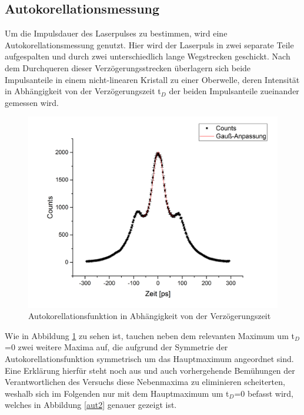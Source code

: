 \subsection{Autokorellationsmessung}
Um die Impulsdauer des Laserpulses zu bestimmen, wird eine Autokorellationsmessung genutzt. Hier wird der Laserpuls in zwei separate Teile aufgespalten und durch zwei unterschiedlich lange Wegstrecken geschickt. Nach dem Durchqueren dieser Verzögerungsstrecken überlagern sich beide Impulsanteile in einem nicht-linearen Kristall zu einer Oberwelle, deren Intensität in Abhängigkeit von der Verzögerungszeit t$_D$ der beiden Impulsanteile zueinander gemessen wird. 
\begin{figure}[H]
	\begin{center}
		\includegraphics[scale=.5]{Bilder/Autokorr1.png}
		\caption{Autokorellationsfunktion in Abhängigkeit von der Verzögerungszeit}
		\label{aut1}
	\end{center}
\end{figure}
Wie in Abbildung \ref{aut1} zu sehen ist, tauchen neben dem relevanten Maximum um t$_D$=0 zwei weitere Maxima auf, die aufgrund der Symmetrie der Autokorellationsfunktion symmetrisch um das Hauptmaximum angeordnet sind. Eine Erklärung hierfür steht noch aus und auch vorhergehende Bemühungen der Verantwortlichen des Versuchs diese Nebenmaxima zu eliminieren scheiterten, weshalb sich im Folgenden nur mit dem Hauptmaximum um t$_D$=0 befasst wird, welches in Abbildung \ref{aut2} genauer gezeigt ist.
